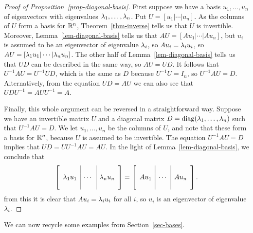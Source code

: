 \documentclass[reqno]{amsart}
\theoremstyle{definition}
\begin{document}
\begin{proof}[Proof of Proposition~\ref{prop-diagonal-basis}]
 First suppose we have a basis $u_1,\dotsc,u_n$ of eigenvectors with
 eigenvalues $\lambda_1,\dotsc,\lambda_n$.  Put $U=[u_1|\cdots|u_n]$.  As the
 columns of $U$ form a basis for ${\mathbb{R}}^n$, Theorem~\ref{thm-inverse}
 tells us that $U$ is invertible.  Moreover,
 Lemma~\ref{lem-diagonal-basis} tells us that $AU=[Au_1|\cdots|Au_n]$,
 but $u_i$ is assumed to be an eigenvector of eigenvalue $\lambda_i$, so
 $Au_i=\lambda_iu_i$, so $AU=[\lambda_1u_1|\cdots|\lambda_nu_n]$.  The other half
 of Lemma~\ref{lem-diagonal-basis} tells us that $UD$ can be described
 in the same way, so $AU=UD$.  It follows that $U^{-1}AU=U^{-1}UD$,
 which is the same as $D$ because $U^{-1}U=I_n$, so $U^{-1}AU=D$.
 Alternatively, from the equation $UD=AU$ we can also see that
 $UDU^{-1}=AUU^{-1}=A$. 

 Finally, this whole argument can be reversed in a straightforward
 way.  Suppose we have an invertible matrix $U$ and a diagonal matrix
 $D=\operatorname{diag}(\lambda_1,\dotsc,\lambda_n)$ such that $U^{-1}AU=D$.  We let
 $u_1,\dotsc,u_n$ be the columns of $U$, and note that these form a
 basis for ${\mathbb{R}}^n$, because $U$ is assumed to be invertible.  The
 equation $U^{-1}AU=D$ implies that $UD=UU^{-1}AU=AU$.  In the light
 of Lemma~\ref{lem-diagonal-basis}, we conclude that
 \[ 
  \left[\begin{array}{c|c|c}
   && \\ \lambda_1u_1 & \cdots & \lambda_nu_n \\ &&
  \end{array}\right]
  = 
  \left[\begin{array}{c|c|c}
   && \\ Au_1 & \cdots & Au_n \\ &&
  \end{array}\right].
 \]
 from this it is clear that $Au_i=\lambda_iu_i$ for all $i$, so $u_i$ is
 an eigenvector of eigenvalue $\lambda_i$.
\end{proof}

We can now recycle some examples from Section~\ref{sec-bases}.
\end{document}
